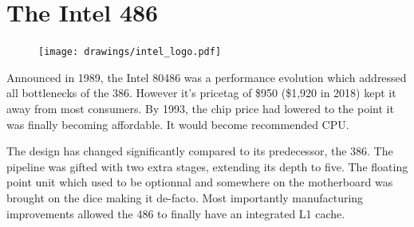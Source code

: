 \section{The Intel 486}

\begin{figure}
\centering
\texttt{[image: drawings/intel\_logo.pdf]}
\end{figure}

Announced in 1989, the Intel 80486 was a performance evolution which addressed all bottlenecks of the 386. However it's pricetag of \$950 (\$1,920 in 2018) kept it away from most consumers. By 1993, the chip price had lowered to the point it was finally becoming affordable. It would become \doom recommended CPU.\\
\par
The design has changed significantly compared to its predecessor, the 386. The pipeline was gifted with two extra stages, extending its depth to five. The floating point unit which used to be optionnal and somewhere on the motherboard was brought on the dice making it de-facto. Most importantly manufacturing improvements allowed the 486 to finally have an integrated L1 cache.\\
\par
{}\\
\par

